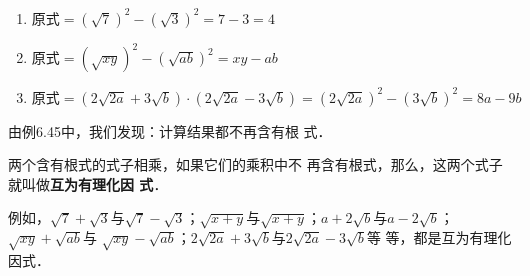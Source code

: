 \begin{solution}
    \begin{enumerate}
        \item $\text{原式}=\left(\sqrt{7}\right)^2-\left(\sqrt{3}\right)^2=7-3=4$
        \item $\text{原式}=\left(\sqrt{xy}\right)^2-\left(\sqrt{ab}\right)^2=xy-ab$
        \item $\text{原式}=\left(2\sqrt{2a}+3\sqrt{b}\right)\cdot\left(2\sqrt{2a}-3\sqrt{b}\right)=\left(2\sqrt{2a}\right)^2-\left(3\sqrt{b}\right)^2=8a-9b$
    \end{enumerate}    
\end{solution}

由例6.45中，我们发现：计算结果都不再含有根
式．

两个含有根式的式子相乘，如果它们的乘积中不
再含有根式，那么，这两个式子就叫做\textbf{互为有理化因
式}．

例如，$\sqrt{7}+\sqrt{3}$与$\sqrt{7}-\sqrt{3}$；$\sqrt{x+y}$与$\sqrt{x+y}$；$a+2\sqrt{b}$与$a-2\sqrt{b}$；$\sqrt{xy}+\sqrt{ab}$与
$\sqrt{xy}-\sqrt{ab}$；$2\sqrt{2a}+3\sqrt{b}$与$2\sqrt{2a}-3\sqrt{b}$等
等，都是互为有理化因式．

